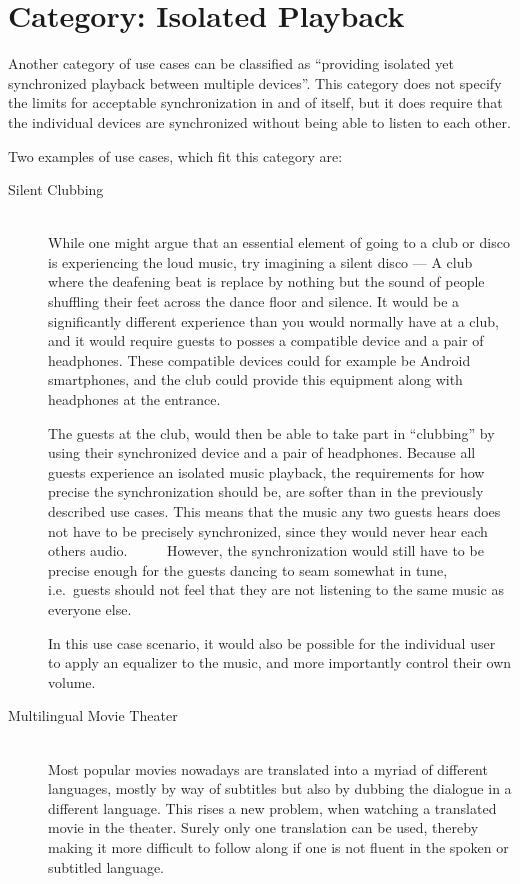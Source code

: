 \section{Category: Isolated Playback}\label{sec:category_isolated_playback}
Another category of use cases can be classified as \enquote{providing isolated yet synchronized playback between multiple devices}.
This category does not specify the limits for acceptable synchronization in and of itself, but it does require that the individual devices are synchronized without being able to listen to each other.

Two examples of use cases, which fit this category are:
\begin{description}
    \item[Silent Clubbing] \hfill\\
        While one might argue that an essential element of going to a club or disco is experiencing the loud music, try imagining a silent disco ---
        A club where the deafening beat is replace by nothing but the sound of people shuffling their feet across the dance floor and silence.
        It would be a significantly different experience than you would normally have at a club, and it would require guests to posses a compatible device and a pair of headphones.
        These compatible devices could for example be Android smartphones, and the club could provide this equipment along with headphones at the entrance.

        The guests at the club, would then be able to take part in \enquote{clubbing} by using their synchronized device and a pair of headphones.
        Because all guests experience an isolated music playback, the requirements for how precise the synchronization should be, are softer than in the previously described use cases.
        This means that the music any two guests hears does not have to be precisely synchronized, since they would never hear each others audio.
        However, the synchronization would still have to be precise enough for the guests dancing to seam somewhat in tune, i.e.~guests should not feel that they are not listening to the same music as everyone else.

        In this use case scenario, it would also be possible for the individual user to apply an equalizer to the music, and more importantly control their own volume.
    \item[Multilingual Movie Theater] \hfill\\
        Most popular movies nowadays are translated into a myriad of different languages, mostly by way of subtitles but also by dubbing the dialogue in a different language.
        This rises a new problem, when watching a translated movie in the theater.
        Surely only one translation can be used, thereby making it more difficult to follow along if one is not fluent in the spoken or subtitled language.


\end{description}
